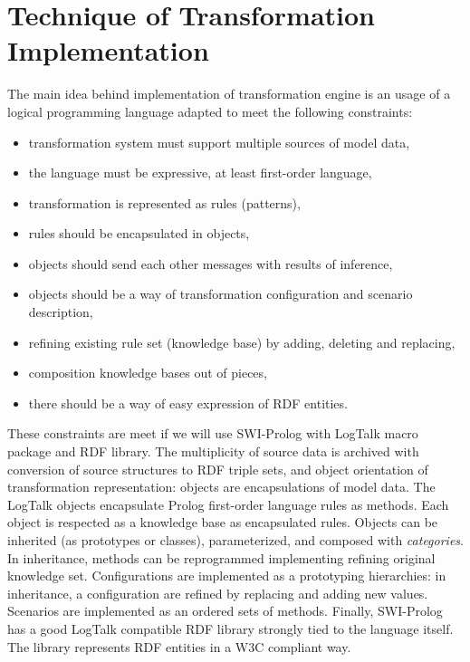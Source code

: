 \documentclass[conference]{IEEEtran}
\begin{document}

\section{Technique of Transformation Implementation}
\label{sec:tech-imp}

The main idea behind implementation of transformation engine is an usage of a logical programming language adapted to meet the following constraints:
\begin{itemize}
\item transformation system must support multiple sources of model data,
\item the language must be expressive, at least first-order language,
\item transformation is represented as rules (patterns),
\item rules should be encapsulated in objects,
\item objects should send each other messages with results of inference,
\item objects should be a way of transformation configuration and scenario description,
\item refining existing rule set (knowledge base) by adding, deleting and replacing,
\item composition knowledge bases out of pieces,
\item there should be a way of easy expression of RDF entities.
\end{itemize}

These constraints are meet if we will use SWI-Prolog with LogTalk macro package and RDF library.  The multiplicity of source data is archived with conversion of source structures to RDF triple sets, and object orientation of transformation representation: objects are encapsulations of model data.  The LogTalk objects encapsulate Prolog first-order language rules as methods.  Each object is respected as a knowledge base as encapsulated rules.  Objects can be inherited (as prototypes or classes), parameterized, and composed with \emph{categories}.  In inheritance, methods can be reprogrammed implementing refining original knowledge set.  Configurations are implemented as a prototyping hierarchies: in inheritance, a configuration are refined by replacing and adding new values.  Scenarios are implemented as an ordered sets of methods.  Finally, SWI-Prolog has a good LogTalk compatible RDF library strongly tied to the language itself.  The library represents RDF entities in a W3C compliant way.
\end{document}
